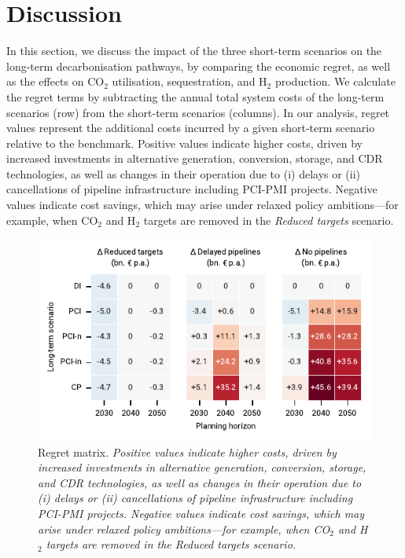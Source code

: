 \documentclass[pdflatex,sn-nature]{sn-jnl}
\theoremstyle{thmstyleone}%
\theoremstyle{thmstyletwo}%
\theoremstyle{thmstylethree}%
\begin{document}
\section{Discussion}\label{sec:discussion}
In this section, we discuss the impact of the three short-term scenarios on the long-term decarbonisation pathways, by comparing the economic regret, as well as the effects on CO$_2$ utilisation, sequestration, and H$_2$ production. We calculate the regret terms by subtracting the annual total system costs of the long-term scenarios (row) from the short-term scenarios (columns). In our analysis, regret values represent the additional costs incurred by a given short-term scenario relative to the benchmark. Positive values indicate higher costs, driven by increased investments in alternative generation, conversion, storage, and CDR technologies, as well as changes in their operation due to (i) delays or (ii) cancellations of pipeline infrastructure including PCI-PMI projects. Negative values indicate cost savings, which may arise under relaxed policy ambitions—for example, when CO$_2$ and H$_2$ targets are removed in the \textit{Reduced targets} scenario.


\begin{figure}[htbp]
  \centering
  \includegraphics{figures/regret_matrix}
  \caption{Regret matrix. \textit{Positive values indicate higher costs, driven by increased investments in alternative generation, conversion, storage, and CDR technologies, as well as changes in their operation due to (i) delays or (ii) cancellations of pipeline infrastructure including PCI-PMI projects. Negative values indicate cost savings, which may arise under relaxed policy ambitions—for example, when CO$_2$ and H$_2$ targets are removed in the \textit{Reduced targets} scenario.}}
  \label{fig:regret_matrix_results}
\end{figure}
\end{document}
